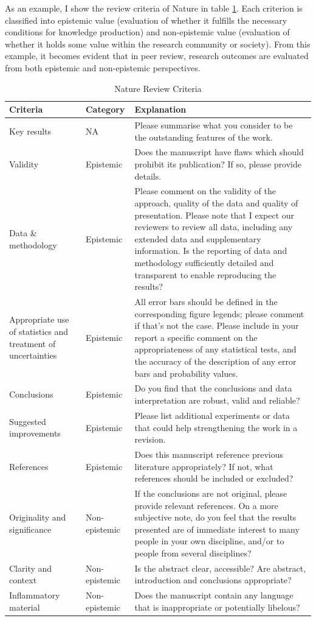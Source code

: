 \documentclass{article}
\begin{document}
As an example, I show the review criteria of Nature in table \ref{tab:nature_review}. Each criterion is classified into epistemic value (evaluation of whether it fulfills the necessary conditions for knowledge production) and non-epistemic value (evaluation of whether it holds some value within the research community or society). From this example, it becomes evident that in peer review, research outcomes are evaluated from both epistemic and non-epistemic perspectives. 

\begin{table}[H]
\centering
\begin{tabularx}{\textwidth}{|X|X|X|}
\hline
\textbf{Criteria} & \textbf{Category} & \textbf{Explanation} \\ 
\hline
Key results & NA & Please summarise what you consider to be the outstanding features of the work. \\ 
\hline
Validity & Epistemic & Does the manuscript have flaws which should prohibit its publication? If so, please provide details. \\ 
\hline
Data \& methodology & Epistemic & Please comment on the validity of the approach, quality of the data and quality of presentation. Please note that I expect our reviewers to review all data, including any extended data and supplementary information. Is the reporting of data and methodology sufficiently detailed and transparent to enable reproducing the results? \\ 
\hline
Appropriate use of statistics and treatment of uncertainties & Epistemic & All error bars should be defined in the corresponding figure legends; please comment if that’s not the case. Please include in your report a specific comment on the appropriateness of any statistical tests, and the accuracy of the description of any error bars and probability values. \\ 
\hline
Conclusions & Epistemic & Do you find that the conclusions and data interpretation are robust, valid and reliable? \\ 
\hline
Suggested improvements & Epistemic & Please list additional experiments or data that could help strengthening the work in a revision. \\ 
\hline
References & Epistemic & Does this manuscript reference previous literature appropriately? If not, what references should be included or excluded? \\ 
\hline
Originality and significance & Non-epistemic & If the conclusions are not original, please provide relevant references. On a more subjective note, do you feel that the results presented are of immediate interest to many people in your own discipline, and/or to people from several disciplines? \\ 
\hline
Clarity and context & Non-epistemic & Is the abstract clear, accessible? Are abstract, introduction and conclusions appropriate? \\ 
\hline
Inflammatory material & Non-epistemic & Does the manuscript contain any language that is inappropriate or potentially libelous? \\ 
\hline
\end{tabularx}
\caption{Nature Review Criteria}
\label{tab:nature_review}
\end{table}
\end{document}
